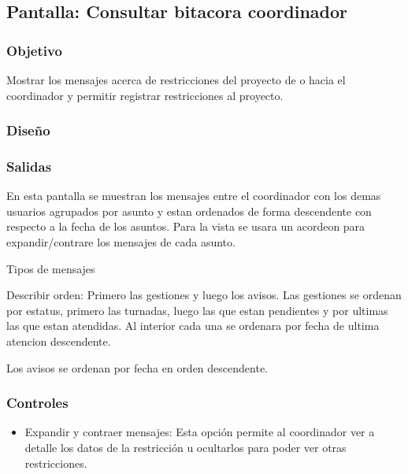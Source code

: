 \subsection{Pantalla: Consultar bitacora coordinador}

\subsubsection{Objetivo}
  Mostrar los mensajes acerca de restricciones del proyecto de o hacia el coordinador y permitir registrar restricciones al proyecto.

\subsubsection{Diseño}

\subsubsection{Salidas}
  En esta pantalla se muestran los mensajes entre el coordinador con los demas usuarios agrupados por asunto y estan ordenados de forma descendente con respecto a la fecha de los asuntos.
  Para la vista se usara un acordeon para expandir/contrare los mensajes de cada asunto.

  Tipos de mensajes
  
  Describir orden: Primero las gestiones y luego los avisos. Las gestiones se ordenan por estatus, primero las turnadas, luego las que estan pendientes y por ultimas las que estan atendidas. Al interior cada una se ordenara por fecha de ultima atencion descendente.

  Los avisos se ordenan por fecha en orden descendente.

\subsubsection{Controles}
\begin{itemize}
 \item Expandir y contraer mensajes: Esta opción permite al coordinador ver a detalle los datos de la restricción u ocultarlos para poder ver otras restricciones.
\end{itemize}


